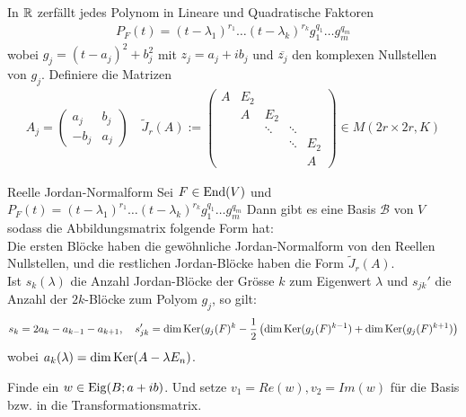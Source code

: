 In $\mathbb{R}$ zerfällt jedes Polynom in Lineare und Quadratische Faktoren
\begin{align*}
    P_F(t) = (t-\lambda_1)^{r_1} \dots (t - \lambda_k)^{r_k} g_1^{q_1} \dots g_m^{q_m}
\end{align*}
wobei $g_j = (t - a_j)^2 + b_j^2$ mit $z_j = a_j + i b_j$ und $\overline{z_j}$ den komplexen Nullstellen von $g_j$.
Definiere die Matrizen
\begin{align*}
    A_j = \begin{pmatrix}
        a_j & b_j\\
        -b_j & a_j
    \end{pmatrix}
    \quad \tilde{J}_r(A) := \begin{pmatrix}
        A & E_2\\
        & A & E_2\\
        & & \ddots & \ddots\\
        & &  & \ddots & E_2\\
        & & & & A
    \end{pmatrix} \in M(2r\times 2r,K)
\end{align*}

\begin{satz}{Reelle Jordan-Normalform}
    Sei $F \in \operatorname{End}(V)$ und $P_F(t) = (t-\lambda_1)^{r_1} \dots (t - \lambda_k)^{r_k} g_1^{q_1} \dots g_m^{q_m}$
    Dann gibt es eine Basis $\mathcal{B}$ von $V$ sodass
    die Abbildungsmatrix folgende Form hat:\\
    Die ersten Blöcke haben die gewöhnliche Jordan-Normalform von den Reellen Nullstellen, und die restlichen Jordan-Blöcke haben die Form $\tilde{J}_r(A)$.\\
    Ist $s_k(\lambda)$ die Anzahl Jordan-Blöcke der Grösse $k$ zum Eigenwert $\lambda$ und $s_{jk}'$ die Anzahl der $2k$-Blöcke zum Polyom $g_j$, so gilt:
    \begin{align*}
        s_{k} = 2a_k - a_{k-1} - a_{k+1}, \quad 
        s_{jk}' = \dim \operatorname{Ker}(g_j(F)^{k} - \frac{1}{2} \left(
            \dim \operatorname{Ker} (g_j(F)^{k-1}) + \dim \operatorname{Ker} (g_j(F)^{k+1})
        \right)
    \end{align*}
    wobei $a_k(\lambda) = \dim \operatorname{Ker}(A - \lambda E_n)$.
\end{satz}


Finde ein $w \in \operatorname{Eig}(B;a+ib)$. Und setze $v_1 = Re(w), v_2 = Im(w)$ für die Basis bzw. in die Transformationsmatrix.

